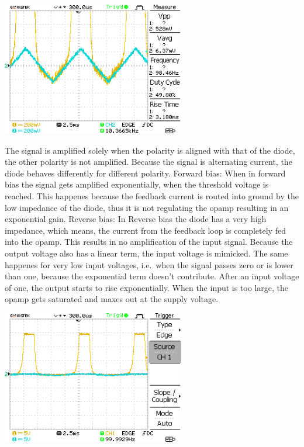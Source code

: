 \documentclass[a4paper,10pt]{article}
\newenvironment{Figure}
        {\par\medskip\noindent\minipage{\linewidth}}
        {\endminipage\par\medskip} %
\numberwithin{equation}{section}
\begin{document}
\begin{multicols}{2}
        \begin{Figure}
                \centering
                \includegraphics[width=0.6\textwidth]{../data/DS0001.png}
                 \label{fig:non_exp}
        \end{Figure}
        \noindent The signal is amplified solely when the polarity is aligned with that of the diode, the other polarity is not amplified.
        Because the signal is alternating current, the diode behaves differently for different polarity.
        Forward bias: 
        When in forward bias the signal gets amplified exponentially, when the threshold voltage is reached.
        This happenes because the feedback current is routed into ground by the low impedance of the diode, thus it is not regulating the opamp resulting in an exponential gain.
        Reverse bias: 
        In Reverse bias the diode has a very high impedance, which means, the current from the feedback loop is completely fed into the opamp.
        This results in no amplification of the input signal.
        Because the output voltage also has a linear term, the input voltage is mimicked.
        The same happenes for very low input voltages, i.e.\ when the signal passes zero or is lower than one, because the exponential term doesn't contribute.
        After an input voltage of one, the output starts to rise exponentially.
        When the input is too large, the opamp gets saturated and maxes out at the supply voltage.
        \begin{Figure}
                \centering
                \includegraphics[width=0.6\textwidth]{../data/DS0002.png}

\end{Figure}
\end{multicols}
\end{document}
